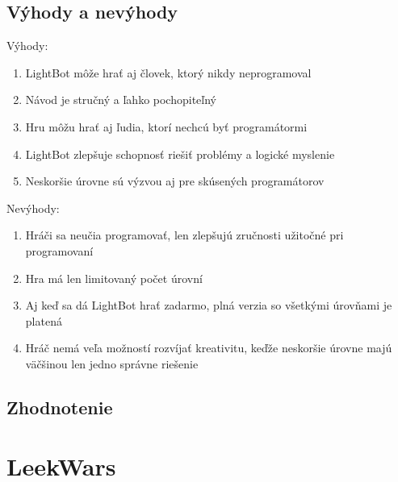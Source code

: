 \documentclass[slovak,a4paper,11pt]{article}
\begin{document}
\subsection{Výhody a nevýhody}
Výhody:
\begin{enumerate}
\item LightBot môže hrať aj človek, ktorý nikdy neprogramoval
\item Návod je stručný a ľahko pochopiteľný
\item Hru môžu hrať aj ľudia, ktorí nechcú byť programátormi
\item LightBot zlepšuje schopnosť riešiť problémy a logické myslenie
\item Neskoršie úrovne sú výzvou aj pre skúsených programátorov
\end{enumerate}
Nevýhody:
\begin{enumerate}
\item Hráči sa neučia programovať, len zlepšujú zručnosti užitočné pri programovaní
\item Hra má len limitovaný počet úrovní
\item Aj keď sa dá LightBot hrať zadarmo, plná verzia so všetkými úrovňami je platená
\item Hráč nemá veľa možností rozvíjať kreativitu, keďže neskoršie úrovne majú väčšinou len jedno správne riešenie
\end{enumerate}
\subsection{Zhodnotenie}

\section{LeekWars}
\end{document}
